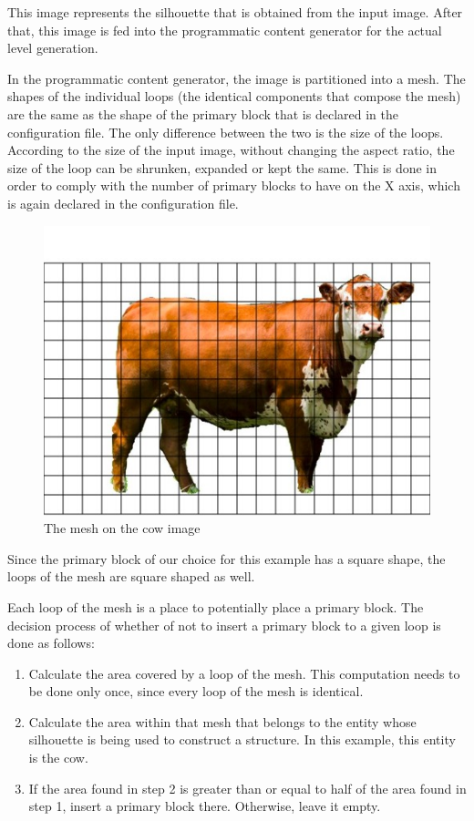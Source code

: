 \documentclass{dalthesis}
\begin{document}
This image represents the silhouette that is obtained from the input image. After that, this image is fed into the programmatic content generator for the actual level generation.

In the programmatic content generator, the image is partitioned into a mesh. The shapes of the individual loops (the identical components that compose the mesh) are the same as the shape of the primary block that is declared in the configuration file. The only difference between the two is the size of the loops. According to the size of the input image, without changing the aspect ratio, the size of the loop can be shrunken, expanded or kept the same. This is done in order to comply with the number of primary blocks to have on the X axis, which is again declared in the configuration file.

\begin{figure}[H]
	\caption{The mesh on the cow image}
  \includegraphics[width=\textwidth,height=\textheight,keepaspectratio]{process/cow-meshed-plain.jpg}
\end{figure}

Since the primary block of our choice for this example has a square shape, the loops of the mesh are square shaped as well.

Each loop of the mesh is a place to potentially place a primary block. The decision process of whether of not to insert a primary block to a given loop is done as follows:

\begin{enumerate}
  \item Calculate the area covered by a loop of the mesh. This computation needs to be done only once, since every loop of the mesh is identical.

  \item Calculate the area within that mesh that belongs to the entity whose silhouette is being used to construct a structure. In this example, this entity is the cow.

  \item If the area found in step 2 is greater than or equal to half of the area found in step 1, insert a primary block there. Otherwise, leave it empty.
\end{enumerate}
\end{document}
